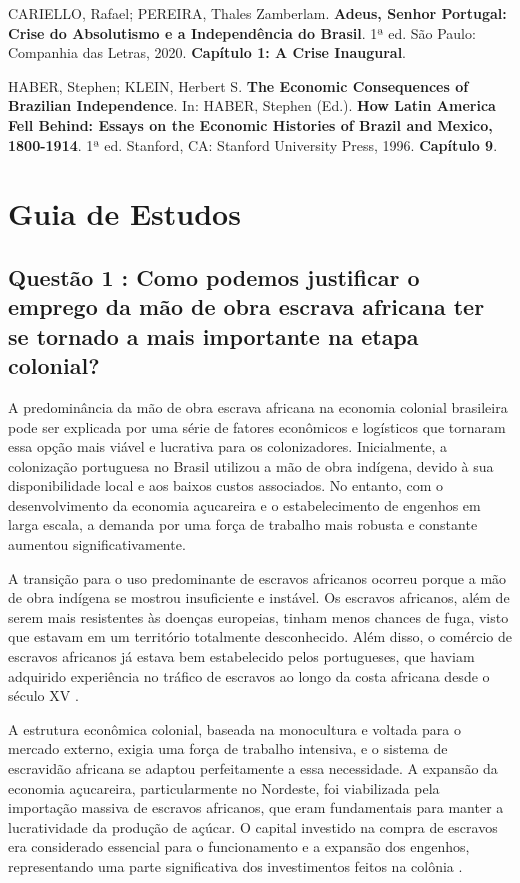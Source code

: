 \documentclass[a4paper,12pt]{article}[abntex2]
\begin{document}
\begin{thebibliography}{99}
CARIELLO, Rafael; PEREIRA, Thales Zamberlam. \textbf{Adeus, Senhor Portugal: Crise do Absolutismo e a Independência do Brasil}. 1ª ed. São Paulo: Companhia das Letras, 2020.
\textbf{Capítulo 1: A Crise Inaugural}.

HABER, Stephen; KLEIN, Herbert S. \textbf{The Economic Consequences of Brazilian Independence}. In: HABER, Stephen (Ed.). \textbf{How Latin America Fell Behind: Essays on the Economic Histories of Brazil and Mexico, 1800-1914}. 1ª ed. Stanford, CA: Stanford University Press, 1996. \textbf{Capítulo 9}.


\end{thebibliography}


\newpage
\section{\textbf{Guia de Estudos}}

\subsection{\textbf{Questão 1 : Como podemos justificar o emprego da mão de obra escrava africana ter se tornado a mais importante na etapa colonial?}}

A predominância da mão de obra escrava africana na economia colonial brasileira pode ser explicada por uma série de fatores econômicos e logísticos que tornaram essa opção mais viável e lucrativa para os colonizadores. Inicialmente, a colonização portuguesa no Brasil utilizou a mão de obra indígena, devido à sua disponibilidade local e aos baixos custos associados. No entanto, com o desenvolvimento da economia açucareira e o estabelecimento de engenhos em larga escala, a demanda por uma força de trabalho mais robusta e constante aumentou significativamente.

A transição para o uso predominante de escravos africanos ocorreu porque a mão de obra indígena se mostrou insuficiente e instável. Os escravos africanos, além de serem mais resistentes às doenças europeias, tinham menos chances de fuga, visto que estavam em um território totalmente desconhecido. Além disso, o comércio de escravos africanos já estava bem estabelecido pelos portugueses, que haviam adquirido experiência no tráfico de escravos ao longo da costa africana desde o século XV .

A estrutura econômica colonial, baseada na monocultura e voltada para o mercado externo, exigia uma força de trabalho intensiva, e o sistema de escravidão africana se adaptou perfeitamente a essa necessidade. A expansão da economia açucareira, particularmente no Nordeste, foi viabilizada pela importação massiva de escravos africanos, que eram fundamentais para manter a lucratividade da produção de açúcar. O capital investido na compra de escravos era considerado essencial para o funcionamento e a expansão dos engenhos, representando uma parte significativa dos investimentos feitos na colônia .
\end{document}
